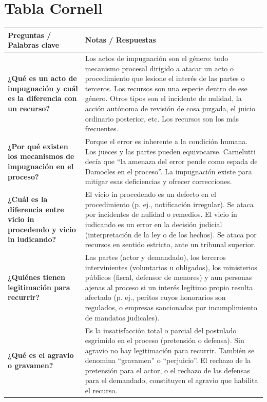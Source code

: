 \documentclass[12pt,oneside]{book}
\begin{document}
\section{Tabla Cornell}

\begin{table}[H]
\centering
\begin{tabularx}{\textwidth}{
    >{\raggedright\arraybackslash}p{}
    >{\raggedright\arraybackslash}X
}
\toprule
\textbf{Preguntas / Palabras clave} & \textbf{Notas / Respuestas} \\
\midrule

\textbf{¿Qué es un acto de impugnación y cuál es la diferencia con un recurso?} & Los actos de impugnación son el género: todo mecanismo procesal dirigido a atacar un acto o procedimiento que lesione el interés de las partes o terceros. Los recursos son una especie dentro de ese género. Otros tipos son el incidente de nulidad, la acción autónoma de revisión de cosa juzgada, el juicio ordinario posterior, etc. Los recursos son los más frecuentes. \\

\textbf{¿Por qué existen los mecanismos de impugnación en el proceso?} & Porque el error es inherente a la condición humana. Los jueces y las partes pueden equivocarse. Carnelutti decía que ``la amenaza del error pende como espada de Damocles en el proceso''. La impugnación existe para mitigar esas deficiencias y ofrecer correcciones. \\

\textbf{¿Cuál es la diferencia entre vicio in procedendo y vicio in iudicando?} & El vicio in procedendo es un defecto en el procedimiento (p. ej., notificación irregular). Se ataca por incidentes de nulidad o remedios. El vicio in iudicando es un error en la decisión judicial (interpretación de la ley o de los hechos). Se ataca por recursos en sentido estricto, ante un tribunal superior. \\

\textbf{¿Quiénes tienen legitimación para recurrir?} & Las partes (actor y demandado), los terceros intervinientes (voluntarios u obligados), los ministerios públicos (fiscal, defensor de menores) y aun personas ajenas al proceso si un interés legítimo propio resulta afectado (p. ej., peritos cuyos honorarios son regulados, o empresas sancionadas por incumplimiento de mandatos judicales). \\

\textbf{¿Qué es el agravio o gravamen?} & Es la insatisfacción total o parcial del postulado esgrimido en el proceso (pretensión o defensa). Sin agravio no hay legitimación para recurrir. También se denomina ``gravamen'' o ``perjuicio''. El rechazo de la pretensión para el actor, o el rechazo de las defensas para el demandado, constituyen el agravio que habilita el recurso. \\


\end{tabularx}
\end{table}
\end{document}
